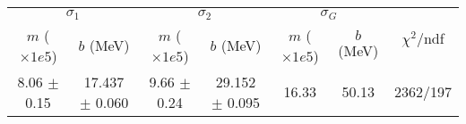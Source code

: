 \begin{tabular}{cc|cc|cc||c}
\multicolumn{2}{c|}{$\sigma_1$} & \multicolumn{2}{|c}{$\sigma_2$} & \multicolumn{2}{|c}{$\sigma_G$}  & \multirow{2}{*}{$\chi^2/$ndf}\\
$m$ ($\times1e5$) & $b$ (MeV) & $m$ ($\times1e5$) & $b$ (MeV) & $m$ ($\times1e5$) & $b$ (MeV) & \\
\hline
8.06 $\pm$ 0.15 & 17.437 $\pm$ 0.060 & 9.66 $\pm$ 0.24 & 29.152 $\pm$ 0.095 & 16.33 & 50.13 & 2362/197\\
\end{tabular}
